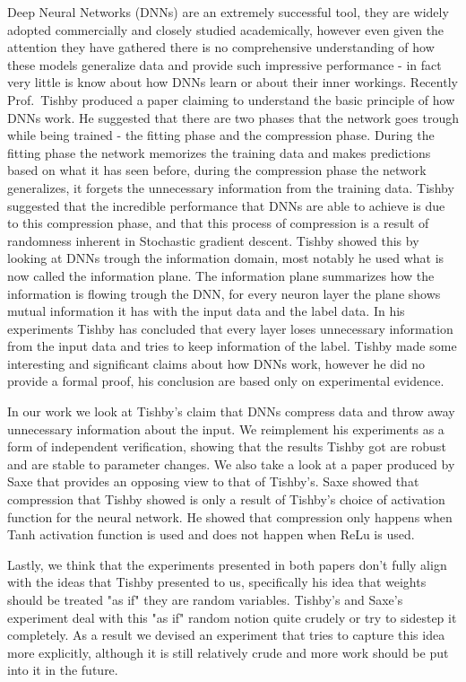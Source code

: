 Deep Neural Networks (DNNs) are an extremely successful tool, they are widely
adopted commercially and closely studied academically, however even given the
attention they have gathered there is no comprehensive understanding of how
these models generalize data and provide such impressive performance - in fact
very little is know about how DNNs learn or about their inner workings. Recently
Prof.\ Tishby produced a paper claiming to understand the basic principle of how
DNNs work. He suggested that there are two phases that the network goes trough
while being trained - the fitting phase and the compression phase. During the
fitting phase the network memorizes the training data and makes predictions
based on what it has seen before, during the compression phase the network
generalizes, it forgets the unnecessary information from the training data.
Tishby suggested that the incredible performance that DNNs are able to achieve
is due to this compression phase, and that this process of compression is a
result of randomness inherent in Stochastic gradient descent. Tishby showed this
by looking at DNNs trough the information domain, most notably he used what is
now called the information plane. The information plane summarizes how the
information is flowing trough the DNN, for every neuron layer the plane shows
mutual information it has with the input data and the label data. In his
experiments Tishby has concluded that every layer loses unnecessary information
from the input data and tries to keep information of the label.
Tishby made some interesting and significant claims about how DNNs work, however
he did no provide a formal proof, his conclusion are based only on experimental
evidence. 

In our work we look at Tishby's claim that DNNs compress data and throw away
unnecessary information about the input. We reimplement his experiments as a
form of independent verification, showing that the results Tishby got are robust
and are stable to parameter changes. We also take a look at a paper produced by
Saxe that provides an opposing view to that of Tishby's. Saxe showed that
compression that Tishby showed is only a result of Tishby's choice of
activation function for the neural network. He showed that compression only
happens when Tanh activation function is used and does not happen when ReLu is
used.

Lastly, we think that the experiments presented in both papers don't fully align
with the ideas that Tishby presented to us, specifically his idea that weights
should be treated "as if" they are random variables. Tishby's and Saxe's
experiment deal with this "as if" random notion quite crudely or try to sidestep
it completely. As a result we devised an experiment that tries to capture this
idea more explicitly, although it is still relatively crude and more work should
be put into it in the future.


